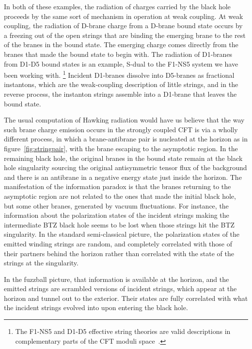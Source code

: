 \documentclass[11pt]{article}
\newcommand{\rcite}{\cite}
\numberwithin{equation}{section}
\begin{document}
In both of these examples, the radiation of charges carried by the black hole proceeds by the same sort of mechanism in operation at weak coupling.  At weak coupling, the radiation of D-brane charge from a D-brane bound state occurs by a freezing out of the open strings that are binding the emerging brane to the rest of the branes in the bound state.  The emerging charge comes directly from the branes that made the bound state to begin with.  The radiation of D1-branes from D1-D5 bound states is an example, S-dual to the F1-NS5 system we have been working with.%
\footnote{The F1-NS5 and D1-D5 effective string theories are valid descriptions in complementary parts of the CFT moduli space~\rcite{Seiberg:1999xz,Larsen:1999uk,Martinec:2022okx}.}  Incident D1-branes dissolve into D5-branes as fractional instantons, which are the weak-coupling description of little strings, and in the reverse process, the instanton strings assemble into a D1-brane that leaves the bound state.

The usual computation of Hawking radiation would have us believe that the way such brane charge emission occurs in the strongly coupled CFT is via a wholly different process, in which a brane-antibrane pair is nucleated at the horizon as in figure~\ref{fig:stringpair}, with the brane escaping to the asymptotic region.  In the remaining black hole, the original branes in the bound state remain at the black hole singularity sourcing the original antisymmetric tensor flux of the background and there is an antibrane in a negative energy state just inside the horizon.  The manifestation of the information paradox is that the branes returning to the asymptotic region are not related to the ones that made the initial black hole, but some other branes, generated by vacuum fluctuations.  For instance, the information about the polarization states of the incident strings making the intermediate BTZ black hole seems to be lost when those strings hit the BTZ singularity.
In the standard semi-classical picture, the polarization states of the emitted winding strings are random, and completely correlated with those of their partners behind the horizon rather than correlated with the state of the strings at the singularity.

In the fuzzball picture, that information is available at the horizon, and the emitted strings are scrambled versions of incident strings, which appear at the horizon and tunnel out to the exterior.  Their states are fully correlated with what the incident strings evolved into upon entering the black hole.
\end{document}
